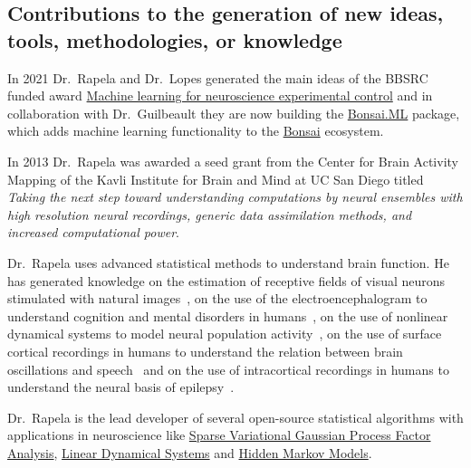 
\subsection{Contributions to the generation of new ideas, tools, methodologies, or knowledge}

In 2021 Dr.~Rapela and Dr.~Lopes generated the main ideas of the BBSRC funded
award
\href{https://gow.bbsrc.ukri.org/grants/AwardDetails.aspx?FundingReference=BB\%2FW019132\%2F1}{Machine
learning for neuroscience experimental control} and in collaboration with
Dr.~Guilbeault they are now building the
\href{https://github.com/bonsai-rx/machinelearning}{Bonsai.ML} package, which
adds machine learning functionality to the
\href{https://bonsai-rx.org/}{Bonsai} ecosystem.

In 2013 Dr.~Rapela was awarded a seed grant from the Center for Brain Activity
Mapping of the Kavli Institute for Brain and Mind at UC San Diego titled
\emph{Taking the next step toward understanding computations by neural
ensembles with high resolution neural recordings, generic data assimilation
methods, and increased computational power}.

Dr.~Rapela uses advanced statistical methods to understand brain function. He has
generated knowledge on the estimation of receptive fields of visual neurons
stimulated with natural images~\citep{rapelaEtAl06,rapelaEtAl10}, on the use of
the electroencephalogram to understand cognition and mental disorders in
humans~\citep{rapelaEtAl12-attentionSwitch,rapelaEtAl12-eyeTracking,rapelaEtAl18-avshift},
on the use of nonlinear dynamical systems to model neural population
activity~\citep{rapelaEtAlInPrepEDMs}, on the use of surface cortical
recordings in humans to understand the relation between brain oscillations and
speech~\citep{rapelaInPrepTWsInSpeech,rapelaInPrepSyncTWs,rapelaInPrepSyncTWsII}
and on the use of intracortical recordings in humans to understand the neural
basis of
epilepsy~\citep{rapelaEtAl19-epilepsy-tsne,rapelaAndTodorov19-epilepsy-hmm}.

Dr.~Rapela is the lead developer of several open-source statistical algorithms
with applications in neuroscience like
\href{https://github.com/joacorapela/svGPFA}{Sparse Variational Gaussian
Process Factor Analysis},
\href{https://github.com/joacorapela/lds\_python}{Linear Dynamical Systems} and
\href{https://github.com/joacorapela/hiddenMarkovModels}{Hidden Markov Models}.

